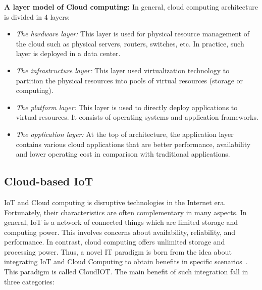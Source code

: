 \par \textbf{A layer model of Cloud computing: } In general, cloud computing architecture is divided in 4 layers:
\begin{itemize}
    \item \textit{The hardware layer: } This layer is used for physical resource management of the cloud such as physical servers, routers, switches, etc. In practice, such layer is deployed in a data center.
    
    \item \textit{The infrastructure layer: } This layer used virtualization technology to partition the physical resources into pools of virtual resources (storage or computing).
    
    \item \textit{The platform layer: } This layer is used to directly deploy applications to virtual resources. It consists of operating systems and application frameworks. 
    
    \item \textit{The application layer: } At the top of architecture, the application layer contains various cloud applications that are better performance, availability and lower operating cost in comparison with traditional applications.
\end{itemize}

\subsection{Cloud-based IoT}

IoT and Cloud computing is disruptive technologies in the Internet era. Fortunately, their characteristics are often complementary in many aspects. In general, IoT is a network of connected things which are limited storage and computing power. This involves concerns about availability, reliability, and performance. In contrast, cloud computing offers unlimited storage and processing power. Thus, a novel IT paradigm is born from the idea about integrating IoT and Cloud Computing to obtain benefits in specific scenarios~\cite{gomes2014future}\cite{alhakbani2014framework}. This paradigm is called CloudIOT. The main benefit of such integration  fall in three categories:

